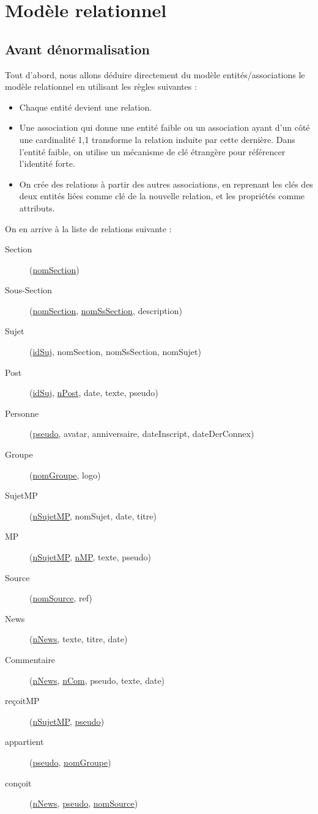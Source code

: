 \section{Modèle relationnel}
\subsection{Avant dénormalisation}
Tout d'abord, nous allons déduire directement du modèle entités/associations le modèle relationnel en utilisant les règles suivantes :
\begin{itemize}
	\item Chaque entité devient une relation.
	\item Une association qui donne une entité faible ou un association ayant d'un côté une cardinalité 1,1 transforme la relation induite par cette dernière. Dans l'entité faible, on utilise un mécanisme de clé étrangère pour référencer l'identité forte.
	\item On crée des relations à partir des autres associations, en reprenant les clés des deux entités liées comme clé de la nouvelle relation, et les propriétés comme attributs. 
\end{itemize}

\bigskip
On en arrive à la liste de relations suivante :

\begin{description}
	\item[Section] (\underline{nomSection})
	\item[Sous-Section] (\underline{nomSection}, \underline{nomSsSection}, description)
	\item[Sujet] (\underline{idSuj}, nomSection, nomSsSection, nomSujet)
	\item[Post] (\underline{idSuj}, \underline{n\degree Post}, date, texte, pseudo)
	\item[Personne] (\underline{pseudo}, avatar, anniversaire, dateInscript, dateDerConnex)
	\item[Groupe] (\underline{nomGroupe}, logo)
	\item[SujetMP] (\underline{n\degree SujetMP}, nomSujet, date, titre)
	\item[MP] (\underline{n\degree SujetMP}, \underline{n\degree MP}, texte, pseudo)
	\item[Source] (\underline{nomSource}, ref)
	\item[News] (\underline{n\degree News}, texte, titre, date)
	\item[Commentaire] (\underline{n\degree News}, \underline{n\degree Com}, pseudo, texte, date)
	\item[reçoitMP] (\underline{n\degree SujetMP}, \underline{pseudo})
	\item[appartient] (\underline{pseudo}, \underline{nomGroupe})
	\item[conçoit] (\underline{n\degree News}, \underline{pseudo}, \underline{nomSource})
\end{description}


